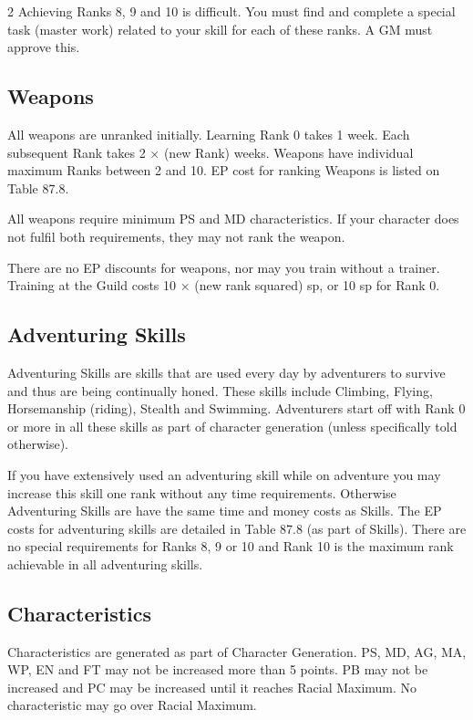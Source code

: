 \begin{multicols}{2}
Achieving Ranks 8, 9 and 10 is difficult. You must find and complete a
special task (master work) related to your skill for each of these
ranks. A GM must approve this.

\subsection{Weapons}

All weapons are unranked initially. Learning Rank 0 takes 1 week. Each
subsequent Rank takes 2 × (new Rank) weeks. Weapons have individual
maximum Ranks between 2 and 10.  EP cost for ranking Weapons is listed
on Table 87.8.

All weapons require minimum PS and MD characteristics. If your
character does not fulfil both requirements, they may not rank the
weapon.

There are no EP discounts for weapons, nor may you train without a
trainer. Training at the Guild costs 10 × (new rank squared) sp, or 10
sp for Rank 0.

\subsection{Adventuring Skills}

Adventuring Skills are skills that are used every day by adventurers
to survive and thus are being continually honed. These skills include
Climbing, Flying, Horsemanship (riding), Stealth and
Swimming. Adventurers start off with Rank 0 or more in all these
skills as part of character generation (unless specifically told
otherwise).

If you have extensively used an adventuring skill while on adventure
you may increase this skill one rank without any time
requirements. Otherwise Adventuring Skills are have the same time and
money costs as Skills. The EP costs for adventuring skills are
detailed in Table 87.8 (as part of Skills).  There are no special
requirements for Ranks 8, 9 or 10 and Rank 10 is the maximum rank
achievable in all adventuring skills.

\subsection{Characteristics}

Characteristics are generated as part of Character Generation. PS, MD,
AG, MA, WP, EN and FT may not be increased more than 5 points. PB may
not be increased and PC may be increased until it reaches Racial
Maximum. No characteristic may go over Racial Maximum.


\end{multicols}

